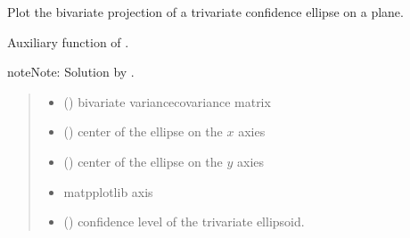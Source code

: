 \documentclass[letterpaper,10pt,english]{sphinxmanual}
\begin{document}
\begin{fulllineitems}
\label{\detokenize{cubmods:cubmods.general.conf_border}}
\pysigstartsignatures
{}
\pysigstopsignatures
\sphinxAtStartPar
Plot the bivariate projection of a trivariate confidence ellipse
on a plane.

\sphinxAtStartPar
Auxiliary function of .

\begin{sphinxadmonition}{note}{Note:}
\sphinxAtStartPar
Solution by .
\end{sphinxadmonition}
\begin{quote}\begin{description}
\begin{itemize}
\item {} 
\sphinxAtStartPar
{} () \textendash{} bivariate variance\sphinxhyphen{}covariance matrix

\item {} 
\sphinxAtStartPar
{} () \textendash{} center of the ellipse on the \(x\) axies

\item {} 
\sphinxAtStartPar
{} () \textendash{} center of the ellipse on the \(y\) axies

\item {} 
\sphinxAtStartPar
{} \textendash{} matpplotlib axis

\item {} 
\sphinxAtStartPar
{} () \textendash{} confidence level of the trivariate ellipsoid.


\end{itemize}
\end{description}
\end{quote}
\end{fulllineitems}
\end{document}
